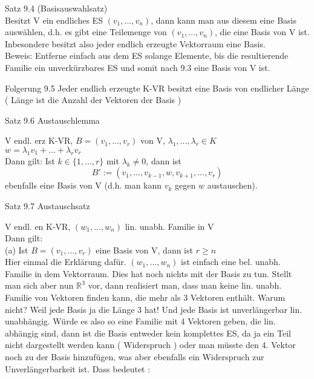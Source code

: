\documentclass[smallheadings,12pt,a4paper]{scrartcl}
\begin{document}
\item[Satz 9.4]
(Basisauswahlsatz) \\
Besitzt V ein endliches ES $(v_1,...,v_n)$, dann kann man aus diesem eine Basis auswählen, d.h. es gibt eine Teilemenge von $(v_1,...,v_n)$, die eine Basis von V ist. \\
Inbesondere besitzt also jeder endlich erzeugte Vektorraum eine Basis. \\
Beweis: Entferne einfach aus dem ES solange Elemente, bis die resultierende Familie ein unverkürzbares ES und somit nach 9.3 eine Basis von V ist. \\

\item[Folgerung 9.5] 
Jeder endlich erzeugte K-VR besitzt eine Basis von endlicher Länge ( Länge ist die Anzahl der Vektoren der Basis )

\newpage

\begin{center}
\item[Satz 9.6 Austauschlemma]
\end{center}
V endl. erz K-VR, $B = (v_1,...,v_r) $ von V, $ \lambda_1,...,\lambda_r \in K$\\
$w = \lambda_1 v_1+...+ \lambda_r v_r $\\
Dann gilt: Ist $k\in \{1,...,r\}$ mit $\lambda_k \neq 0 $, dann ist \\
$$ B' := (v_1,...,v_{k-1},w,v_{k+1},...,v_r) $$
ebenfalls eine Basis von V (d.h. man kann $v_k$ gegen $w$ austauschen).\\

\newpage


\begin{center}
\item[Satz 9.7 Austauschsatz]
\end{center}

V endl. en K-VR, $(w_1,...,w_n)$ lin. unabh. Familie in V \\
Dann gilt: \\

(a) Ist $B = (v_1,...,v_r) $ eine Basis von V, dann ist $r\geq n$ \\

Hier einmal die Erklärung dafür. $(w_1,...,w_n)$ ist einfach eine bel. unabh. Familie in dem Vektorraum. Dies hat noch nichts mit der Basis zu tun. Stellt man sich aber nun $\mathbb{R^3}$ vor, dann realisiert man, dass man keine lin. unabh. Familie von Vektoren finden kann, die mehr als 3 Vektoren enthält. Warum nicht? Weil jede Basis ja die Länge 3 hat! Und jede Basis ist unverlängerbar lin. unabhängig. Würde es also so eine Familie mit 4 Vektoren geben, die lin. abhängig sind, dann ist die Basis entweder kein komplettes ES, da ja ein Teil nicht dargestellt werden kann ( Widerspruch ) oder man müsste den 4. Vektor noch zu der Basis hinzufügen, was aber ebenfalls ein Widerspruch zur Unverlängerbarkeit ist. Dass bedeutet : \\
\end{document}
